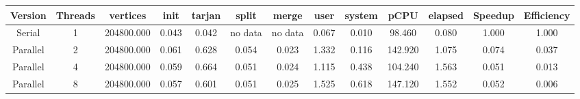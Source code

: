 \begin{tabular}{|c|c|c|c|c|c|c|c|c|c|c|c|c|}
\toprule
 Version &  Threads &   vertices &  init &  tarjan &   split &   merge &  user &  system &    pCPU &  elapsed &  Speedup &  Efficiency \\
\midrule
  Serial &        1 & 204800.000 & 0.043 &   0.042 & no data & no data & 0.067 &   0.010 &  98.460 &    0.080 &    1.000 &       1.000 \\
Parallel &        2 & 204800.000 & 0.061 &   0.628 &   0.054 &   0.023 & 1.332 &   0.116 & 142.920 &    1.075 &    0.074 &       0.037 \\
Parallel &        4 & 204800.000 & 0.059 &   0.664 &   0.051 &   0.024 & 1.115 &   0.438 & 104.240 &    1.563 &    0.051 &       0.013 \\
Parallel &        8 & 204800.000 & 0.057 &   0.601 &   0.051 &   0.025 & 1.525 &   0.618 & 147.120 &    1.552 &    0.052 &       0.006 \\
\bottomrule
\end{tabular}
